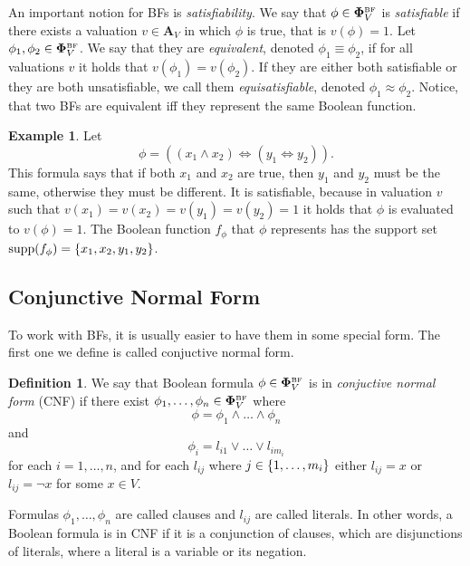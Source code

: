 \documentclass[
  digital, %
  color,
  twoside, %
  table,   %
  nolof,     %
  nolot,     %
]{fithesis3}
\let\setbuilder\set
\newcommand{\simpleset}[1]{\{{#1}\}}
\renewcommand{\set}[1]{\normalexpandarg\IfSubStr{#1}{|}{\setbuilder{#1}}{\simpleset{#1}}}
\theoremstyle{definition}
\newtheorem{definition}{Definition}
\newtheorem{example}{Example}
\theoremstyle{remark}
\newcommand{\BF}[1]{\mathbf{\Phi}_{#1}^{\normalfont{\text{\tiny BF}}}}
\newcommand{\valtns}[1]{\mathbf{A}_{#1}}
\newcommand{\supp}[1]{\mathrm{supp}(#1)}
\newcommand{\lequal}{\Leftrightarrow}
\begin{document}
An important notion for BFs is \emph{satisfiability}. We say that $\phi \in \BF{V}$ is \emph{satisfiable} if there exists a valuation $v \in \valtns{V}$ in which $\phi$ is true, that is $v(\phi) = 1$. Let $\phi_1, \phi_2 \in \BF{V}$. We say that they are \emph{equivalent}, denoted $\phi_1 \equiv \phi_2$, if for all valuations $v$ it holds that $v(\phi_1) = v(\phi_2)$. If they are either both satisfiable or they are both unsatisfiable, we call them \emph{equisatisfiable}, denoted $\phi_1 \approx \phi_2$. Notice, that two BFs are equivalent iff they represent the same Boolean function.

\begin{example}
\label{ex:BF:prenex}
Let
\[\phi = ((x_1 \land x_2) \lequal (y_1 \lequal y_2)).\]
This formula says that if both $x_1$ and $x_2$ are true, then $y_1$ and $y_2$ must be the same, otherwise they must be different. It is satisfiable, because in valuation $v$ such that $v(x_1) = v(x_2) = v(y_1) = v(y_2) = 1$ it holds that $\phi$ is evaluated to $v(\phi)=1$. The Boolean function $f_{\phi}$ that $\phi$ represents has the support set $\supp{f_{\phi}} = \set{x_1, x_2, y_1, y_2}$.
\end{example}

\subsection{Conjunctive Normal Form}
\label{sec:BF:CNF}
To work with BFs, it is usually easier to have them in some special form. The first one we define is called conjuctive normal form.

\begin{definition}
We say that Boolean formula $\phi \in \BF{V}$ is in \emph{conjuctive normal form} (CNF) if there exist $\phi_1,\dots,\phi_n \in \BF{V}$ where
\[\phi = \phi_1 \land \dots \land \phi_n\]
and
\[\phi_i = l_{i1} \lor \dots \lor l_{i{m_i}}\]
for each $i = 1, \dots, n$, and for each $l_{ij}$ where $j \in \set{1,\dots,m_i}$ either $l_{ij} = x$ or $l_{ij} = \neg x$ for some $x \in V$.
\end{definition}
Formulas $\phi_1,\dots,\phi_n$ are called clauses and $l_{ij}$ are called literals. In other words, a Boolean formula is in CNF if it is a conjunction of clauses, which are disjunctions of literals, where a literal is a variable or its negation.
\end{document}
